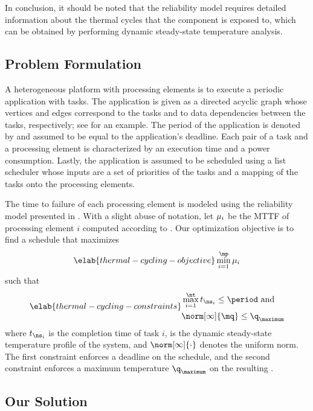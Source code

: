 In conclusion, it should be noted that the reliability model requires detailed
information about the thermal cycles that the component is exposed to, which can
be obtained by performing dynamic steady-state temperature analysis.

\subsection{Problem Formulation}

A heterogeneous platform with \np processing elements is to execute a periodic
application with \nt tasks. The application is given as a directed acyclic graph
whose vertices and edges correspond to the tasks and to data dependencies
between the tasks, respectively; see  for an
example. The period of the application is denoted by \period and assumed to be
equal to the application's deadline. Each pair of a task and a processing
element is characterized by an execution time and a power consumption. Lastly,
the application is assumed to be scheduled using a list scheduler whose inputs
are a set of priorities of the tasks and a mapping of the tasks onto the
processing elements.

The time to failure of each processing element is modeled using the reliability
model presented in . With a slight abuse of notation,
let $\mu_i$ be the \ac{MTTF} of processing element $i$ computed according to
. Our optimization objective is to find a schedule
that maximizes
\begin{equation} \elab{thermal-cycling-objective}
  \min_{i = 1}^\np \mean_i
\end{equation}
such that
\begin{align} \elab{thermal-cycling-constraints}
  \begin{split}
    & \max_{i = 1}^\nt t_{\ns_i} \leq \period \text{ and} \\
    & \norm[\infty]{\mq} \leq \q_\maximum
  \end{split}
\end{align}
where $t_{\ns_i}$ is the completion time of task $i$, \mq is the dynamic
steady-state temperature profile of the system, and $\norm[\infty]{\cdot}$
denotes the uniform norm. The first constraint enforces a deadline on the
schedule, and the second constraint enforces a maximum temperature $\q_\maximum$
on the resulting \mq.

\subsection{Our Solution}

